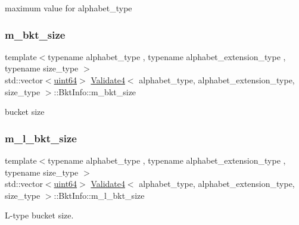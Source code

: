 maximum value for alphabet\+\_\+type 

\mbox{\label{struct_validate4_1_1_bkt_info_a1659db6479f4667a77043e842b93f3fc}} 
\subsubsection{\texorpdfstring{m\+\_\+bkt\+\_\+size}{m\_bkt\_size}}
{\footnotesize\ttfamily template$<$typename alphabet\+\_\+type , typename alphabet\+\_\+extension\+\_\+type , typename size\+\_\+type $>$ \\
std\+::vector$<$\hyperlink{types_8h_a60e8696a4678cd348e991a1f172e53f7}{uint64}$>$ \hyperlink{class_validate4}{Validate4}$<$ alphabet\+\_\+type, alphabet\+\_\+extension\+\_\+type, size\+\_\+type $>$\+::Bkt\+Info\+::m\+\_\+bkt\+\_\+size}



bucket size 

\mbox{\label{struct_validate4_1_1_bkt_info_a0b44f8a1a308a6fff54cb0d05dd63ec4}} 
\subsubsection{\texorpdfstring{m\+\_\+l\+\_\+bkt\+\_\+size}{m\_l\_bkt\_size}}
{\footnotesize\ttfamily template$<$typename alphabet\+\_\+type , typename alphabet\+\_\+extension\+\_\+type , typename size\+\_\+type $>$ \\
std\+::vector$<$\hyperlink{types_8h_a60e8696a4678cd348e991a1f172e53f7}{uint64}$>$ \hyperlink{class_validate4}{Validate4}$<$ alphabet\+\_\+type, alphabet\+\_\+extension\+\_\+type, size\+\_\+type $>$\+::Bkt\+Info\+::m\+\_\+l\+\_\+bkt\+\_\+size}



L-\/type bucket size. 

\mbox{\label{struct_validate4_1_1_bkt_info_ad615aafce19e6e86948b227ad517b3cd}} 
